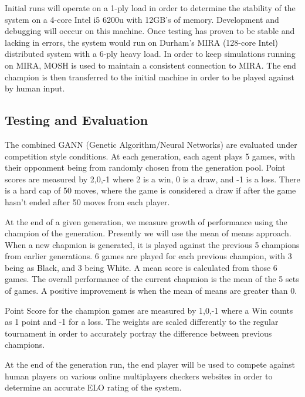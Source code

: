\documentclass[12pt,a4paper]{article}
\begin{document}
    Initial runs will operate on a 1-ply load in order to determine the stability of the system on a 4-core Intel i5 6200u with 12GB's of memory. Development and debugging will occcur on this machine. Once testing has proven to be stable and lacking in errors, the system would run on Durham's MIRA (128-core Intel) distributed system with a 6-ply heavy load. In order to keep simulations running on MIRA, MOSH is used to maintain a consistent  connection to MIRA. The end champion is then transferred to the initial machine in order to be played against by human input.

\subsection*{Testing and Evaluation}
    The combined GANN (Genetic Algorithm/Neural Networks) are evaluated under competition style conditions. At each generation, each agent plays 5 games, with their opponment being from randomly chosen from the generation pool. Point scores are measured by {2,0,-1} where 2 is a win, 0 is a draw, and -1 is a loss. There is a hard cap of 50 moves, where the game is considered a draw if after the game hasn't ended after 50 moves from each player.

    At the end of a given generation, we measure growth of performance using the champion of the generation. Presently we will use the mean of means approach. When a new chapmion is generated, it is played against the previous 5 champions from earlier generations. 6 games are played for each previous champion, with 3 being as Black, and 3 being White. A mean score is calculated from those 6 games. The overall performance of the current chapmion is the mean of the 5 sets of games. A positive improvement is when the mean of means are greater than 0. 

    Point Score for the champion games are measured by {1,0,-1} where a Win counts as 1 point and -1 for a loss. The weights are scaled differently to the regular tournament in order to accurately portray the difference between previous champions.

    At the end of the generation run, the end player will be used to compete against human players on various online multiplayers checkers websites in order to determine an accurate ELO rating of the system.



\end{document}
